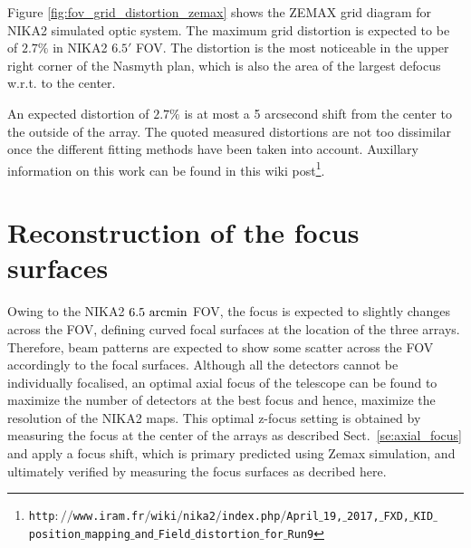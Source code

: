 Figure \ref{fig:fov_grid_distortion_zemax} shows the ZEMAX grid diagram for
NIKA2 simulated optic system. The maximum grid distortion is expected
to be of $2.7\%$ in NIKA2 $6.5'$ FOV. The distortion is the most
noticeable in the upper right corner of the Nasmyth plan, which is
also the area of the largest defocus w.r.t. to the center. 

An expected distortion of $2.7\%$ is at most a 5 arcsecond shift from the
center to the outside of the array.  The quoted measured distortions are not
too dissimilar once the different fitting methods have been taken into
account. Auxillary information on this work can be found in this wiki post\footnote{\tiny
  {\tt http$://$www.iram.fr$/$wiki$/$nika2$/$index.php$/$April$\_$19,$\_$2017,$\_$FXD,$\_$KID$\_$position$\_$mapping$\_$and$\_$Field$\_$distortion$\_$for$\_$Run9}}.



\section{Reconstruction of the focus surfaces}%
\label{sec:focus_surfaces}

Owing to the NIKA2 $6.5~\rm{arcmin}$ FOV, the focus is expected to
slightly changes across the FOV, defining curved focal surfaces at the
location of the three arrays. Therefore, beam patterns are expected to
show some scatter across the FOV accordingly to the focal
surfaces. Although all the detectors cannot be individually focalised,
an optimal axial focus of the telescope can be found to maximize the
number of detectors at the best focus and hence, maximize the
resolution of the NIKA2 maps.
This optimal z-focus setting is obtained by measuring the focus at the center of the arrays as described
Sect.~\ref{se:axial_focus} and apply a focus shift, which is primary
predicted using Zemax simulation, and ultimately verified by measuring
the focus surfaces as decribed here.

